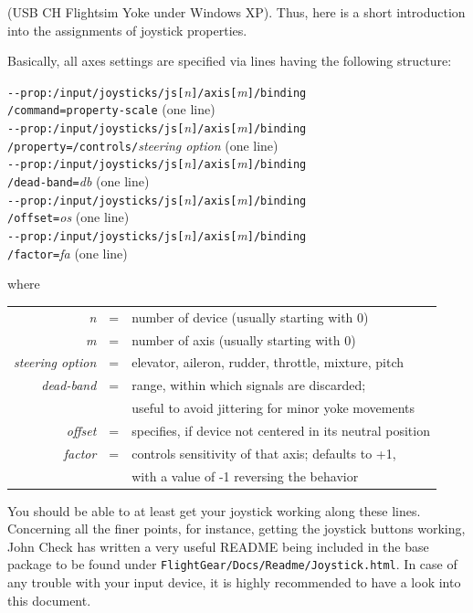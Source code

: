 (USB CH Flightsim Yoke under Windows XP). Thus, here is a short introduction into the assignments of joystick properties.

Basically, all axes settings are specified via lines having the following structure:
 \medskip

\noindent
\texttt{-$ $-prop:/input/joysticks/js[}\textit{n}\texttt{]/axis[}\textit{m}\texttt{]/binding}\\
\texttt{/command=property-scale} (one line)\\
\texttt{-$ $-prop:/input/joysticks/js[}\textit{n}\texttt{]/axis[}\textit{m}\texttt{]/binding}\\
\texttt{/property=/controls/}\textit{steering option} (one line)\\
\texttt{-$ $-prop:/input/joysticks/js[}\textit{n}\texttt{]/axis[}\textit{m}\texttt{]/binding}\\
\texttt{/dead-band=}\textit{db} (one line)\\
\texttt{-$ $-prop:/input/joysticks/js[}\textit{n}\texttt{]/axis[}\textit{m}\texttt{]/binding}\\
\texttt{/offset=}\textit{os} (one line)\\
\texttt{-$ $-prop:/input/joysticks/js[}\textit{n}\texttt{]/axis[}\textit{m}\texttt{]/binding}\\
\texttt{/factor=}\textit{fa} (one line)\\
\medskip

 \noindent
 where
 \medskip

\begin{tabular}{rcl}
 \textit{n} &=& number of device (usually starting with 0)\\
 \textit{m} &=& number of axis (usually starting with 0)\\
 \textit{steering option} &=& elevator, aileron, rudder, throttle, mixture, pitch\\
 \textit{dead-band} &=& range, within which signals are discarded;\\
                   && useful to avoid jittering for minor yoke movements\\
 \textit{offset} &=& specifies, if device not centered in its neutral position\\
  \textit{factor} &=& controls sensitivity of that axis; defaults to +1,\\ 
                 &&with a value of -1 reversing the behavior
  \end{tabular}
 \medskip

You should be able to at least get your joystick working along
these lines. Concerning all the finer points, for instance, getting the joystick buttons
working, John Check has written a very useful README being included in the base package to be found under \texttt{FlightGear/Docs/Readme/Joystick.html}. In case of any trouble with your input device, it is highly recommended to have a look into this document.

